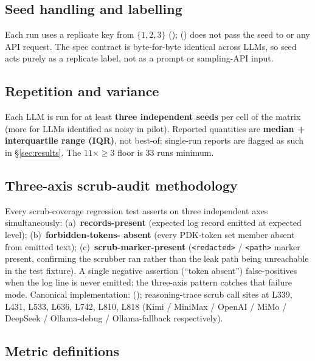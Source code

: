 \subsection{Seed handling and labelling}
\label{sec:method-seed}

Each run uses a replicate key from $\{1, 2, 3\}$
();
() does not pass the
seed to  or any API request. The spec
contract is byte-for-byte identical across LLMs, so seed acts
purely as a replicate label, not as a prompt or sampling-API
input.

\subsection{Repetition and variance}
\label{sec:method-rep}

Each LLM is run for at least \textbf{three independent seeds} per
cell of the matrix (more for LLMs identified as noisy in pilot).
Reported quantities are \textbf{median + interquartile range
(IQR)}, not best-of; single-run reports are flagged as such in
\S\ref{sec:results}. The $11\times\geq 3$ floor is 33 runs minimum.

\subsection{Three-axis scrub-audit methodology}
\label{sec:method-audit}

Every scrub-coverage regression test asserts on three independent
axes simultaneously: (a)~\textbf{records-present} (expected log
record emitted at expected level); (b)~\textbf{forbidden-tokens-%
absent} (every PDK-token set member absent from emitted text);
(c)~\textbf{scrub-marker-present}
(\texttt{<redacted>} / \texttt{<path>} marker present, confirming
the scrubber ran rather than the leak path being unreachable in
the test fixture). A single negative assertion (``token absent'')
false-positives when the log line is never emitted; the three-axis
pattern catches that failure mode. Canonical implementation:
(); reasoning-trace
scrub call sites at 
L339, L431, L533, L636, L742, L810, L818
(Kimi / MiniMax / OpenAI / MiMo / DeepSeek / Ollama-debug /
Ollama-fallback respectively).

\subsection{Metric definitions}
\label{sec:method-metrics}


